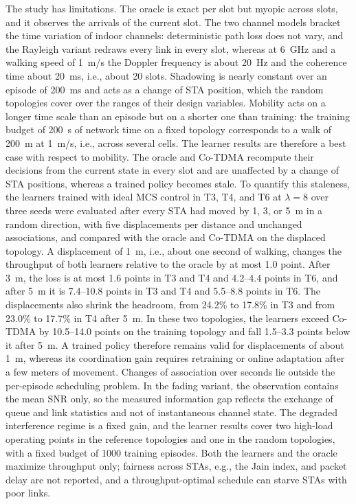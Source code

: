 \documentclass{ieeeaccess}
\begin{document}
The study has limitations. The oracle is exact per slot but myopic across slots, and it observes the arrivals of the current slot. The two channel models bracket the time variation of indoor channels: deterministic path loss does not vary, and the Rayleigh variant redraws every link in every slot, whereas at 6~GHz and a walking speed of 1~m/s the Doppler frequency is about 20~Hz and the coherence time about 20~ms, i.e., about 20 slots. Shadowing is nearly constant over an episode of 200~ms and acts as a change of STA position, which the random topologies cover over the ranges of their design variables. Mobility acts on a longer time scale than an episode but on a shorter one than training: the training budget of 200~s of network time on a fixed topology corresponds to a walk of 200~m at 1~m/s, i.e., across several cells. The learner results are therefore a best case with respect to mobility. The oracle and Co-TDMA recompute their decisions from the current state in every slot and are unaffected by a change of STA positions, whereas a trained policy becomes stale. To quantify this staleness, the learners trained with ideal MCS control in T3, T4, and T6 at $\lambda = 8$ over three seeds were evaluated after every STA had moved by 1, 3, or 5~m in a random direction, with five displacements per distance and unchanged associations, and compared with the oracle and Co-TDMA on the displaced topology. A displacement of 1~m, i.e., about one second of walking, changes the throughput of both learners relative to the oracle by at most 1.0 point. After 3~m, the loss is at most 1.6 points in T3 and T4 and 4.2--4.4 points in T6, and after 5~m it is 7.4--10.8 points in T3 and T4 and 5.5--8.8 points in T6. The displacements also shrink the headroom, from 24.2\% to 17.8\% in T3 and from 23.0\% to 17.7\% in T4 after 5~m. In these two topologies, the learners exceed Co-TDMA by 10.5--14.0 points on the training topology and fall 1.5--3.3 points below it after 5~m. A trained policy therefore remains valid for displacements of about 1~m, whereas its coordination gain requires retraining or online adaptation after a few meters of movement. Changes of association over seconds lie outside the per-episode scheduling problem. In the fading variant, the observation contains the mean SNR only, so the measured information gap reflects the exchange of queue and link statistics and not of instantaneous channel state. The degraded interference regime is a fixed gain, and the learner results cover two high-load operating points in the reference topologies and one in the random topologies, with a fixed budget of 1000 training episodes. Both the learners and the oracle maximize throughput only; fairness across STAs, e.g., the Jain index, and packet delay are not reported, and a throughput-optimal schedule can starve STAs with poor links.
\end{document}
